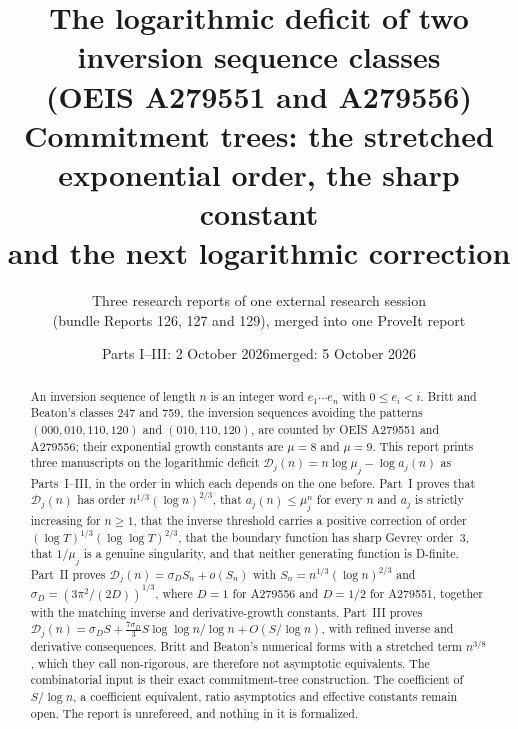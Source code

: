 \documentclass[11pt,letterpaper]{article}
\title{\textbf{The logarithmic deficit of two inversion sequence classes\\ (OEIS A279551 and A279556)}\\[7pt]
\large Commitment trees: the stretched exponential order, the sharp constant\\ and the next logarithmic correction}
\author{Three research reports of one external research session\\(bundle Reports 126, 127 and 129), merged into one ProveIt report}
\date{Parts I--III: 2 October 2026\quad merged: 5 October 2026}
\theoremstyle{remark}\newtheorem{remark}[theorem]{Remark}
\numberwithin{equation}{section}
\newcommand{\Dfc}{\mathcal D}
\begin{document}
\hypersetup{pageanchor=false}
\maketitle
\begin{abstract}
An inversion sequence of length $n$ is an integer word $e_1\cdots e_n$ with $0\le e_i<i$. Britt and Beaton's classes 247 and 759, the inversion sequences avoiding the patterns $(000,010,110,120)$ and $(010,110,120)$, are counted by OEIS A279551 and A279556; their exponential growth constants are $\mu=8$ and $\mu=9$. This report prints three manuscripts on the logarithmic deficit $\Dfc_j(n)=n\log\mu_j-\log a_j(n)$ as Parts~I--III, in the order in which each depends on the one before. Part~I proves that $\Dfc_j(n)$ has order $n^{1/3}(\log n)^{2/3}$, that $a_j(n)\le\mu_j^n$ for every $n$ and $a_j$ is strictly increasing for $n\ge1$, that the inverse threshold carries a positive correction of order $(\log T)^{1/3}(\log\log T)^{2/3}$, that the boundary function has sharp Gevrey order~$3$, that $1/\mu_j$ is a genuine singularity, and that neither generating function is D-finite. Part~II proves $\Dfc_j(n)=\sigma_DS_n+o(S_n)$ with $S_n=n^{1/3}(\log n)^{2/3}$ and $\sigma_D=(3\pi^2/(2D))^{1/3}$, where $D=1$ for A279556 and $D=1/2$ for A279551, together with the matching inverse and derivative-growth constants. Part~III proves $\Dfc_j(n)=\sigma_DS+\frac{7\sigma_D}{3}S\log\log n/\log n+O(S/\log n)$, with refined inverse and derivative consequences. Britt and Beaton's numerical forms with a stretched term $n^{3/8}$, which they call non-rigorous, are therefore not asymptotic equivalents. The combinatorial input is their exact commitment-tree construction. The coefficient of $S/\log n$, a coefficient equivalent, ratio asymptotics and effective constants remain open. The report is unrefereed, and nothing in it is formalized.
\end{abstract}
\hypersetup{pageanchor=true}
\setcounter{tocdepth}{1}
{\small\setlength{\parskip}{0pt}\tableofcontents}
\newpage
\end{document}
